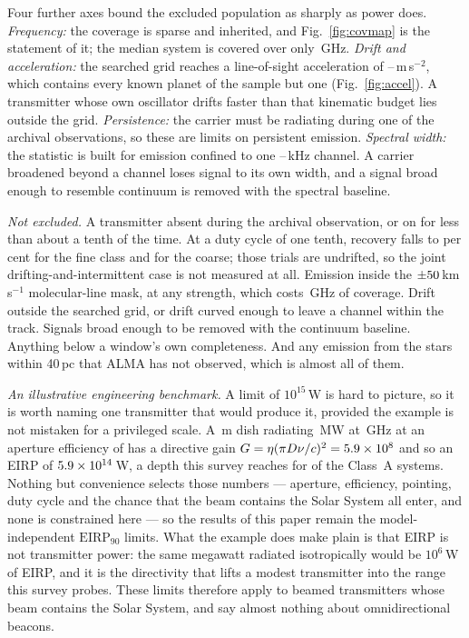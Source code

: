 Four further axes bound the excluded population as sharply as power does.
\emph{Frequency:} the coverage is sparse and inherited, and
Fig.~\ref{fig:covmap} is the statement of it; the median system is covered
over only \SysUnionAMed\,GHz. \emph{Drift and acceleration:} the searched grid
reaches a line-of-sight acceleration of
\AccelCeilMed--\AccelCeilMax\,m\,s$^{-2}$, which contains every known planet
of the sample but one (Fig.~\ref{fig:accel}). A transmitter whose own
oscillator drifts faster than that kinematic budget lies outside the grid.
\emph{Persistence:} the carrier must be radiating during one of the
archival observations, so these are limits on persistent emission.
\emph{Spectral width:} the statistic is built for emission confined to one
\ChanLoA--\ChanHiA\,kHz channel. A carrier broadened beyond a channel loses
signal to its own width, and a signal broad enough to resemble continuum is
removed with the spectral baseline.

\noindent\emph{Not excluded.} A transmitter absent during the archival
observation, or on for less than about a tenth of the time. At a duty cycle
of one tenth, recovery falls
to \DwellFineT{} per cent for the fine class and \DwellCoarseT{} for the
coarse; those trials are undrifted, so the joint drifting-and-intermittent
case is not measured at all. Emission inside the
$\pm50$\,km\,s$^{-1}$ molecular-line mask, at any strength, which
costs \MaskLostGHz\,GHz of coverage. Drift outside the searched grid, or
drift curved enough to leave a channel within the track. Signals broad enough
to be removed with the continuum baseline. Anything below a window's own
completeness. And any emission from the \NGaiaCensus{} stars within 40\,pc
that ALMA has not observed, which is almost all of them.

\noindent\emph{An illustrative engineering benchmark.} A limit of
$10^{15}$\,W is hard to picture, so it is worth naming one transmitter that
would produce it, provided the example is not mistaken for a privileged
scale. A \BenchDiam\,m dish radiating \BenchPowerMW\,MW at \BenchFreqGHz\,GHz
at an aperture efficiency of \BenchEta{} has a directive gain
$G=\eta(\pi D\nu/c)^{2}=5.9\times10^{8}$ and so an EIRP of $5.9\times10^{14}$\,W, a
depth this survey reaches for \BenchNSysA{} of the \NSysClassA{} Class~A
systems. Nothing but convenience selects those numbers --- aperture,
efficiency, pointing, duty cycle and the chance that the beam contains the
Solar System all enter, and none is constrained here --- so the results of
this paper remain the model-independent $\mathrm{EIRP}_{90}$ limits. What the
example does make plain is that EIRP is not transmitter power: the same
megawatt radiated isotropically would be $10^{6}$\,W of EIRP, and it is the
directivity that lifts a modest transmitter into the range this survey
probes. These limits therefore apply to beamed transmitters whose beam
contains the Solar System, and say almost nothing about omnidirectional
beacons.

